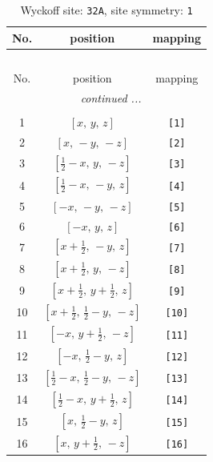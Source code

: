 \documentclass[fleqn,8pt]{jsarticle}
\begin{document}
\renewcommand{\arraystretch}{1.2}
\begin{longtable}{ccc}
\caption{Wyckoff site: {\tt 32A}, site symmetry: {\tt 1}}
 \\
 \hline \hline
No. & position & mapping \\ \hline \endfirsthead

\multicolumn{2}{l}{\tablename\ \thetable{}} \\
 \hline \hline
No. & position & mapping \\ \hline \endhead

 \hline \hline
\multicolumn{2}{r}{\footnotesize\it continued ...} \\ \endfoot

 \hline \hline
\multicolumn{2}{r}{} \\ \endlastfoot

1 & $\left[ x,\, y,\, z \right]$ & {\tt [1]} \\ \hline
2 & $\left[ x,\, - y,\, - z \right]$ & {\tt [2]} \\ \hline
3 & $\left[ \frac{1}{2} - x,\, y,\, - z \right]$ & {\tt [3]} \\ \hline
4 & $\left[ \frac{1}{2} - x,\, - y,\, z \right]$ & {\tt [4]} \\ \hline
5 & $\left[ - x,\, - y,\, - z \right]$ & {\tt [5]} \\ \hline
6 & $\left[ - x,\, y,\, z \right]$ & {\tt [6]} \\ \hline
7 & $\left[ x + \frac{1}{2},\, - y,\, z \right]$ & {\tt [7]} \\ \hline
8 & $\left[ x + \frac{1}{2},\, y,\, - z \right]$ & {\tt [8]} \\ \hline
9 & $\left[ x + \frac{1}{2},\, y + \frac{1}{2},\, z \right]$ & {\tt [9]} \\ \hline
10 & $\left[ x + \frac{1}{2},\, \frac{1}{2} - y,\, - z \right]$ & {\tt [10]} \\ \hline
11 & $\left[ - x,\, y + \frac{1}{2},\, - z \right]$ & {\tt [11]} \\ \hline
12 & $\left[ - x,\, \frac{1}{2} - y,\, z \right]$ & {\tt [12]} \\ \hline
13 & $\left[ \frac{1}{2} - x,\, \frac{1}{2} - y,\, - z \right]$ & {\tt [13]} \\ \hline
14 & $\left[ \frac{1}{2} - x,\, y + \frac{1}{2},\, z \right]$ & {\tt [14]} \\ \hline
15 & $\left[ x,\, \frac{1}{2} - y,\, z \right]$ & {\tt [15]} \\ \hline
16 & $\left[ x,\, y + \frac{1}{2},\, - z \right]$ & {\tt [16]} \\ \hline

\end{longtable}
\end{document}
